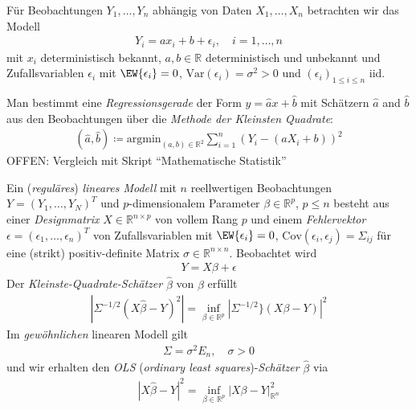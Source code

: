 \documentclass[a4paper]{scrartcl}
\begin{document}
		\begin{motivation}
			Für Beobachtungen $Y_1,\dots, Y_n$ abhängig von Daten $X_1,\dots, X_n$ betrachten wir das Modell
			\begin{align*}
				Y_i=ax_i+b+\epsilon_i,\quad i=1,\dots,n
			\end{align*}
			mit $x_i$ deterministisch bekannt, $a,b\in\mathbb{R}$ deterministisch und unbekannt und Zufallsvariablen $\epsilon_i$ mit $\EW{\epsilon_i}=0$, $\text{Var}(\epsilon_i)=\sigma^2>0$ und $(\epsilon_i)_{1\le i\le n}$ iid.
			
			Man bestimmt eine \emph{Regressionsgerade} der Form $y=\hat{a}x+\hat{b}$ mit Schätzern $\hat{a}$ and $\hat{b}$ aus den Beobachtungen über die \emph{Methode der Kleinsten Quadrate}:
			\begin{align*}
				(\hat{a},\hat{b})\coloneq\text{argmin}_{(a,b)\in\mathbb{R}^2}\sum_{i=1}^n\left(Y_i-(aX_i+b)\right)^2
			\end{align*}
			OFFEN: Vergleich mit Skript "`Mathematische Statistik"'
		\end{motivation}
		\begin{definition}
			Ein (\emph{reguläres}) \emph{lineares Modell} mit $n$ reellwertigen Beobachtungen $Y=(Y_1,\dots, Y_N)^T$ und $p$-dimensionalem Parameter $\beta\in\mathbb{R}^p$, $p\le n$ besteht aus einer \emph{Designmatrix} $X\in\mathbb{R}^{n\times p}$ von vollem Rang $p$ und einem \emph{Fehlervektor} $\epsilon=(\epsilon_1,\dots,\epsilon_n)^T$ von Zufallsvariablen mit $\EW{\epsilon_i}=0$, $\text{Cov}(\epsilon_i,\epsilon_j)=\Sigma_{ij}$ für eine (strikt) positiv-definite Matrix $\sigma\in\mathbb{R}^{n\times n}$. Beobachtet wird
			\begin{align*}
				Y=X\beta+\epsilon
			\end{align*}
			Der \emph{Kleinste-Quadrate-Schätzer} $\hat{\beta}$ von $\beta$ erfüllt
			\begin{align*}
				\left|\Sigma^{-1/2}\left(X\hat{\beta}-Y\right)^2\right|=\inf_{\beta\in\mathbb{R}^p}\left|\Sigma^{-1/2}\}\left(X\beta-Y\right)\right|^2
			\end{align*}
			Im \emph{gewöhnlichen} linearen Modell gilt
			\begin{align*}
				\Sigma=\sigma^2 E_n,\quad\sigma>0
			\end{align*}
			und wir erhalten den \emph{OLS} (\emph{ordinary least squares})-\emph{Schätzer} $\hat{\beta}$ via
			\begin{align*}
				\left|X\hat{\beta}-Y\right|^2=\inf_{\beta\in\mathbb{R}^p}\left|X\beta-Y\right|_{\mathbb{R}^n}^2
			\end{align*}
		\end{definition}						
		
\end{document}
